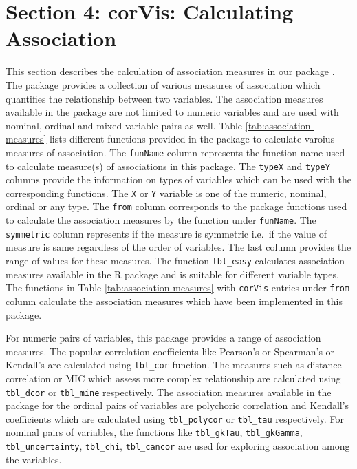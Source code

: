 \hypertarget{section-4-corvis-calculating-association}{%
\section{Section 4: corVis: Calculating
Association}\label{section-4-corvis-calculating-association}}

This section describes the calculation of association measures in our
package . The package provides a collection of various
measures of association which quantifies the relationship between two
variables. The association measures available in the package are not
limited to numeric variables and are used with nominal, ordinal and
mixed variable pairs as well. Table \ref{tab:association-measures} lists
different functions provided in the package to calculate varoius
measures of association. The \texttt{funName} column represents the
function name used to calculate measure(s) of associations in this
package. The \texttt{typeX} and \texttt{typeY} columns provide the
information on types of variables which can be used with the
corresponding functions. The \texttt{X} or \texttt{Y} variable is one of
the numeric, nominal, ordinal or any type. The \texttt{from} column
corresponds to the package functions used to calculate the association
measures by the function under \texttt{funName}. The \texttt{symmetric}
column represents if the measure is symmetric i.e.~if the value of
measure is same regardless of the order of variables. The last column
provides the range of values for these measures. The function
\texttt{tbl\_easy} calculates association measures available in the R
package  and is suitable for different variable
types. The functions in Table \ref{tab:association-measures} with
\texttt{corVis} entries under \texttt{from} column calculate the
association measures which have been implemented in this package.

For numeric pairs of variables, this package provides a range of
association measures. The popular correlation coefficients like
Pearson's or Spearman's or Kendall's are calculated using
\texttt{tbl\_cor} function. The measures such as distance correlation or
MIC which assess more complex relationship are calculated using
\texttt{tbl\_dcor} or \texttt{tbl\_mine} respectively. The association
measures available in the package for the ordinal pairs of variables are
polychoric correlation and Kendall's coefficients which are calculated
using \texttt{tbl\_polycor} or \texttt{tbl\_tau} respectively. For
nominal pairs of variables, the functions like \texttt{tbl\_gkTau},
\texttt{tbl\_gkGamma}, \texttt{tbl\_uncertainty}, \texttt{tbl\_chi},
\texttt{tbl\_cancor} are used for exploring association among the
variables.

